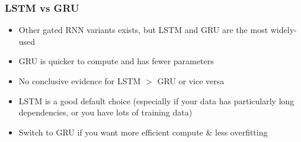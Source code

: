 \documentclass[11pt]{article}
\begin{document}
\begin{figure}[H]
    \centering
\end{figure}

\subsubsection{LSTM vs GRU}

\begin{itemize}
    \item Other gated RNN variants exists, but LSTM and GRU are the most widely-used
    \item GRU is quicker to compute and has fewer parameters
    \item No conclusive evidence for LSTM $>$ GRU or vice versa
    \item LSTM is a good default choice (especially if your data has particularly long dependencies, or you have lots of training data)
    \item Switch to GRU if you want more efficient compute \& less overfitting
\end{itemize}
\end{document}
